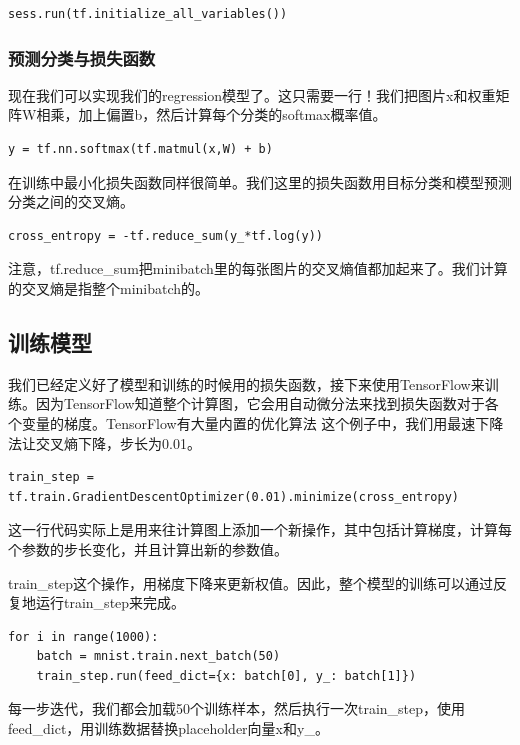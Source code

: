 \documentclass[a4paper,11pt,twoside]{ctexbook}
\begin{document}
\begin{lstlisting}
sess.run(tf.initialize_all_variables())
\end{lstlisting}

\subsubsection{预测分类与损失函数}
现在我们可以实现我们的regression模型了。这只需要一行！我们把图片x和权重矩阵W相乘，加上偏置b，然后计算每个分类的softmax概率值。

\begin{lstlisting}
y = tf.nn.softmax(tf.matmul(x,W) + b)
\end{lstlisting}

在训练中最小化损失函数同样很简单。我们这里的损失函数用目标分类和模型预测分类之间的交叉熵。

\begin{lstlisting}
cross_entropy = -tf.reduce_sum(y_*tf.log(y))
\end{lstlisting}

注意，tf.reduce\_sum把minibatch里的每张图片的交叉熵值都加起来了。我们计算的交叉熵是指整个minibatch的。

\subsection{训练模型}

我们已经定义好了模型和训练的时候用的损失函数，接下来使用TensorFlow来训练。因为TensorFlow知道整个计算图，它会用自动微分法来找到损失函数对于各个变量的梯度。TensorFlow有大量内置的优化算法 这个例子中，我们用最速下降法让交叉熵下降，步长为0.01。

\begin{lstlisting}
train_step = tf.train.GradientDescentOptimizer(0.01).minimize(cross_entropy)
\end{lstlisting}

这一行代码实际上是用来往计算图上添加一个新操作，其中包括计算梯度，计算每个参数的步长变化，并且计算出新的参数值。

train\_step这个操作，用梯度下降来更新权值。因此，整个模型的训练可以通过反复地运行train\_step来完成。

\begin{lstlisting}
for i in range(1000):
    batch = mnist.train.next_batch(50)
    train_step.run(feed_dict={x: batch[0], y_: batch[1]})
\end{lstlisting}

每一步迭代，我们都会加载50个训练样本，然后执行一次train\_step，使用feed\_dict，用训练数据替换placeholder向量x和y\_。
\end{document}
